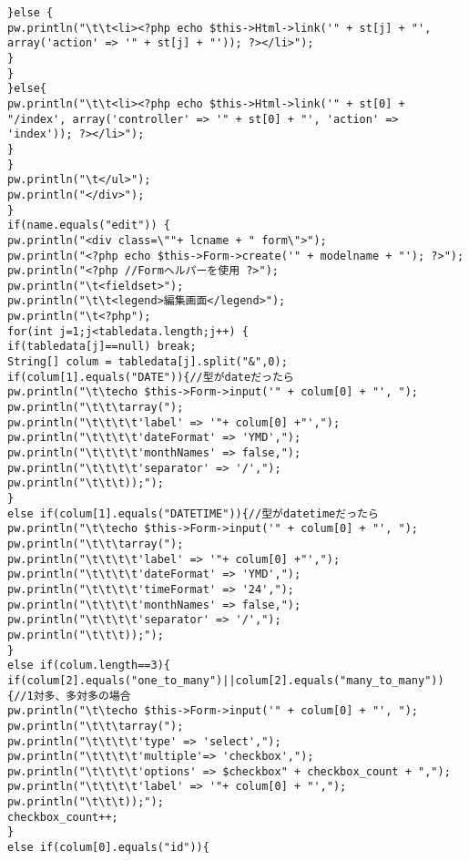 \documentclass{funthesis}
\begin{document}
\begin{lstlisting}[caption=WriteView.java,label=1]
}else {
pw.println("\t\t<li><?php echo $this->Html->link('" + st[j] + "', array('action' => '" + st[j] + "')); ?></li>");
}
}
}else{
pw.println("\t\t<li><?php echo $this->Html->link('" + st[0] + "/index', array('controller' => '" + st[0] + "', 'action' => 'index')); ?></li>");
}
}
pw.println("\t</ul>");
pw.println("</div>");
}
if(name.equals("edit")) {
pw.println("<div class=\""+ lcname + " form\">");
pw.println("<?php echo $this->Form->create('" + modelname + "'); ?>");
pw.println("<?php //Formヘルパーを使用 ?>");
pw.println("\t<fieldset>");
pw.println("\t\t<legend>編集画面</legend>");
pw.println("\t<?php");
for(int j=1;j<tabledata.length;j++) {
if(tabledata[j]==null) break;
String[] colum = tabledata[j].split("&",0);
if(colum[1].equals("DATE")){//型がdateだったら
pw.println("\t\techo $this->Form->input('" + colum[0] + "', ");
pw.println("\t\t\tarray(");
pw.println("\t\t\t\t'label' => '"+ colum[0] +"',");
pw.println("\t\t\t\t'dateFormat' => 'YMD',");
pw.println("\t\t\t\t'monthNames' => false,");
pw.println("\t\t\t\t'separator' => '/',");
pw.println("\t\t\t));");
}
else if(colum[1].equals("DATETIME")){//型がdatetimeだったら
pw.println("\t\techo $this->Form->input('" + colum[0] + "', ");
pw.println("\t\t\tarray(");
pw.println("\t\t\t\t'label' => '"+ colum[0] +"',");
pw.println("\t\t\t\t'dateFormat' => 'YMD',");
pw.println("\t\t\t\t'timeFormat' => '24',");
pw.println("\t\t\t\t'monthNames' => false,");
pw.println("\t\t\t\t'separator' => '/',");
pw.println("\t\t\t));");
}
else if(colum.length==3){
if(colum[2].equals("one_to_many")||colum[2].equals("many_to_many")){//1対多、多対多の場合
pw.println("\t\techo $this->Form->input('" + colum[0] + "', ");
pw.println("\t\t\tarray(");
pw.println("\t\t\t\t'type' => 'select',");
pw.println("\t\t\t\t'multiple'=> 'checkbox',");
pw.println("\t\t\t\t'options' => $checkbox" + checkbox_count + ",");
pw.println("\t\t\t\t'label' => '"+ colum[0] + "',");
pw.println("\t\t\t));");
checkbox_count++;
}
else if(colum[0].equals("id")){


\end{lstlisting}
\end{document}
